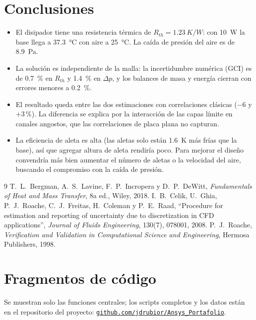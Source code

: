 \documentclass[11pt,letterpaper]{article}
\begin{document}
\section{Conclusiones}
\begin{itemize}
\item El disipador tiene una resistencia térmica de $R_{th}=\SI{1.23}{K/W}$: con \SI{10}{W} la base llega a \SI{37.3}{\celsius} con aire a \SI{25}{\celsius}. La caída de presión del aire es de \SI{8.9}{Pa}.
\item La solución es independiente de la malla: la incertidumbre numérica (GCI) es de \SI{0.7}{\%} en $R_{th}$ y \SI{1.4}{\%} en $\Delta p$, y los balances de masa y energía cierran con errores menores a \SI{0.2}{\%}.
\item El resultado queda entre las dos estimaciones con correlaciones clásicas ($-6$ y $+3\,\%$). La diferencia se explica por la interacción de las capas límite en canales angostos, que las correlaciones de placa plana no capturan.
\item La eficiencia de aleta es alta (las aletas solo están \SI{1.6}{K} más frías que la base), así que agregar altura de aleta rendiría poco. Para mejorar el diseño convendría más bien aumentar el número de aletas o la velocidad del aire, buscando el compromiso con la caída de presión.
\end{itemize}

\begin{thebibliography}{9}
 T.~L.~Bergman, A.~S.~Lavine, F.~P.~Incropera y D.~P.~DeWitt, \emph{Fundamentals of Heat and Mass Transfer}, 8a ed., Wiley, 2018.
 I.~B.~Celik, U.~Ghia, P.~J.~Roache, C.~J.~Freitas, H.~Coleman y P.~E.~Raad, ``Procedure for estimation and reporting of uncertainty due to discretization in CFD applications'', \emph{Journal of Fluids Engineering}, 130(7), 078001, 2008.
 P.~J.~Roache, \emph{Verification and Validation in Computational Science and Engineering}, Hermosa Publishers, 1998.
\end{thebibliography}
\appendix
\section{Fragmentos de código}
\label{ap:codigo}
Se muestran solo las funciones centrales; los scripts completos y los datos están en el repositorio del proyecto: \href{https://github.com/jdrubior/Ansys_Portafolio}{\texttt{github.com/jdrubior/Ansys\_Portafolio}}.


\end{document}
